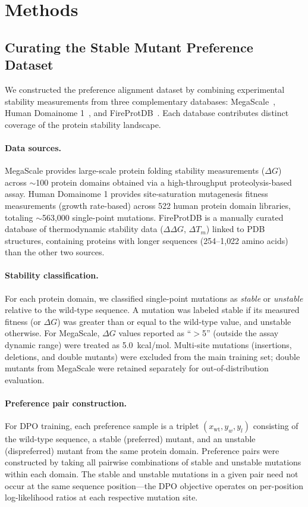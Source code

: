 \section{Methods}
\subsection{Curating the Stable Mutant Preference Dataset}\label{sec:dataset_curation}

We constructed the preference alignment dataset by combining experimental stability measurements from three complementary databases: MegaScale~\citep{tsuboyama2023mega}, Human Domainome 1~\citep{beltran2025site}, and FireProtDB~\citep{stourac2021fireprotdb}.
Each database contributes distinct coverage of the protein stability landscape.

\paragraph{Data sources.}
MegaScale provides large-scale protein folding stability measurements ($\Delta G$) across $\sim$100 protein domains obtained via a high-throughput proteolysis-based assay.
Human Domainome 1 provides site-saturation mutagenesis fitness measurements (growth rate-based) across 522 human protein domain libraries, totaling $\sim$563{,}000 single-point mutations.
FireProtDB is a manually curated database of thermodynamic stability data ($\Delta\Delta G$, $\Delta T_m$) linked to PDB structures, containing proteins with longer sequences (254--1{,}022 amino acids) than the other two sources.

\paragraph{Stability classification.}
For each protein domain, we classified single-point mutations as \textit{stable} or \textit{unstable} relative to the wild-type sequence.
A mutation was labeled stable if its measured fitness (or $\Delta G$) was greater than or equal to the wild-type value, and unstable otherwise.
For MegaScale, $\Delta G$ values reported as ``$>$5'' (outside the assay dynamic range) were treated as 5.0~kcal/mol.
Multi-site mutations (insertions, deletions, and double mutants) were excluded from the main training set; double mutants from MegaScale were retained separately for out-of-distribution evaluation.

\paragraph{Preference pair construction.}
For DPO training, each preference sample is a triplet $(x_{\text{wt}}, y_w, y_l)$ consisting of the wild-type sequence, a stable (preferred) mutant, and an unstable (dispreferred) mutant from the same protein domain.
Preference pairs were constructed by taking all pairwise combinations of stable and unstable mutations within each domain.
The stable and unstable mutations in a given pair need not occur at the same sequence position---the DPO objective operates on per-position log-likelihood ratios at each respective mutation site.

